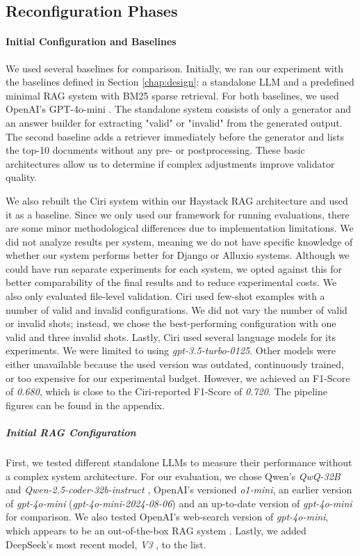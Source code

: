 \subsection{Reconfiguration Phases} \label{sec:exp_results} 

\paragraph{Initial Configuration and Baselines} \label{sec:exp_initial_config}
We used several baselines for comparison. Initially, we ran our experiment with the baselines defined in Section \ref{chap:design}: a standalone LLM and a predefined minimal RAG system with BM25 sparse retrieval. For both baselines, we used OpenAI's GPT-4o-mini \cite{OpenAI_2022}. The standalone system consists of only a generator and an answer builder for extracting "valid" or "invalid" from the generated output. The second baseline adds a retriever immediately before the generator and lists the top-10 documents without any pre- or postprocessing. These basic architectures allow us to determine if complex adjustments improve validator quality.

We also rebuilt the Ciri system within our Haystack RAG architecture and used it as a baseline. Since we only used our framework for running evaluations, there are some minor methodological differences due to implementation limitations. We did not analyze results per system, meaning we do not have specific knowledge of whether our system performs better for Django or Alluxio systems. Although we could have run separate experiments for each system, we opted against this for better comparability of the final results and to reduce experimental costs. We also only evaluated file-level validation. Ciri used few-shot examples with a number of valid and invalid configurations. We did not vary the number of valid or invalid shots; instead, we chose the best-performing configuration with one valid and three invalid shots. Lastly, Ciri used several language models for its experiments. We were limited to using \textit{gpt-3.5-turbo-0125}\cite{OpenAI_2022}. Other models were either unavailable because the used version was outdated, continuously trained, or too expensive for our experimental budget. However, we achieved an F1-Score of \textit{0.680}, which is close to the Ciri-reported F1-Score of \textit{0.720}. The pipeline figures can be found in the appendix.

\subparagraph{Initial RAG Configuration} 
First, we tested different standalone LLMs to measure their performance without a complex system architecture. For our evaluation, we chose Qwen's \textit{QwQ-32B} \cite{qwq32b} and \textit{Qwen-2.5-coder-32b-instruct} \cite{hui2024qwen2}\cite{qwen2}\cite{qwen2.5}, OpenAI's versioned \textit{o1-mini}, an earlier version of \textit{gpt-4o-mini} (\textit{gpt-4o-mini-2024-08-06}) and an up-to-date version of \textit{gpt-4o-mini} for comparison. We also tested OpenAI's web-search version of \textit{gpt-4o-mini}, which appears to be an out-of-the-box RAG system \cite{OpenAI_2022}. Lastly, we added DeepSeek's most recent model, \textit{V3} \cite{deepseekai2024deepseekv3technicalreport}, to the list. 

